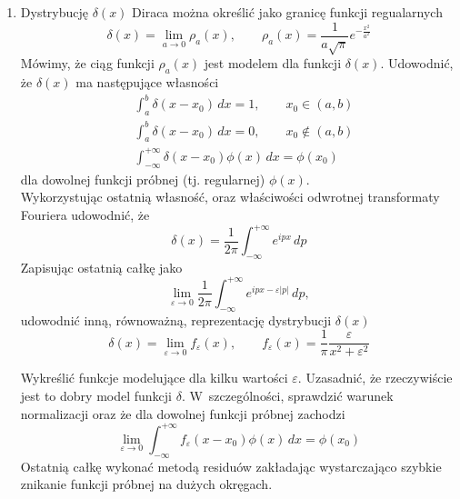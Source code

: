 \documentclass[a4paper,11pt]{article}
\begin{document}
\begin{enumerate}
\item Dystrybucję $\delta( x )$ Diraca można określić jako granicę funkcji
  regualarnych
  \begin{equation}
    \label{eq:1}
    \delta( x ) = \lim_{ a \to 0 } \rho_{ a }( x ), \qquad
    \rho_{ a }( x ) = \frac{ 1 }{ a \sqrt{ \pi } } e^{ -\frac{ x^{ 2 } }{ a^{ 2 } } }
  \end{equation}
  Mówimy, że ciąg funkcji $\rho_{ a }( x )$ jest modelem dla funkcji
  $\delta( x )$. Udowodnić, że $\delta( x )$ ma następujące własności
  \begin{align}
    &\int_{ a }^{ b } \delta( x - x_{ 0 } ) \, dx = 1, \qquad
      x_{ 0 } \in ( a, b ) \\
    &\int_{ a }^{ b } \delta( x - x_{ 0 } ) \, dx = 0, \qquad
      x_{ 0 } \notin ( a, b ) \\
    &\int_{ -\infty }^{ +\infty } \delta( x - x_{ 0 } ) \phi( x ) \, dx = \phi( x_{ 0 } )
  \end{align}
  dla dowolnej funkcji próbnej (tj. regularnej) $\phi( x )$. \\
  Wykorzystując ostatnią własność, oraz właściwości odwrotnej
  transformaty Fouriera udowodnić, że
  \begin{equation}
    \label{eq:2}
    \delta( x ) = \frac{ 1 }{ 2\pi } \int_{ -\infty }^{ +\infty } e^{ i p x } \, dp
  \end{equation}
  Zapisując ostatnią całkę jako
  \begin{equation}
    \label{eq:3}
    \lim_{ \varepsilon \to 0 } \frac{ 1 }{ 2\pi } \int_{ -\infty }^{ +\infty } e^{ ipx - \varepsilon | p | } \, dp,
  \end{equation}
  udowodnić inną, równoważną, reprezentację dystrybucji $\delta( x )$
  \begin{equation}
    \label{eq:4}
    \delta( x ) = \lim_{ \varepsilon \to 0 } f_{ \varepsilon }( x ), \qquad
    f_{ \varepsilon }( x ) = \frac{ 1 }{ \pi } \frac{ \varepsilon }{ x^{ 2 } + \varepsilon^{ 2 } }
  \end{equation}

  Wykreślić funkcje modelujące dla kilku wartości $\varepsilon$. Uzasadnić, że
  rzeczywiście jest to dobry model funkcji $\delta$. W~szczególności,
  sprawdzić warunek normalizacji oraz że dla dowolnej funkcji próbnej
  zachodzi
  \begin{equation}
    \label{eq:5}
    \lim_{ \varepsilon \to 0} \int_{ -\infty }^{ +\infty } f_{ \varepsilon }( x - x_{ 0 } ) \phi( x ) \, dx
    =
    \phi( x_{ 0 } )
  \end{equation}
  Ostatnią całkę wykonać metodą residuów zakładając wystarczająco
  szybkie znikanie funkcji próbnej na dużych okręgach.


\end{enumerate}
\end{document}
